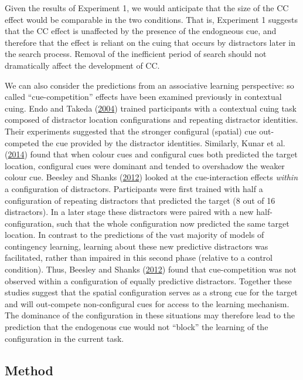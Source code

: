\documentclass[
  man,
  floatsintext,
  longtable,
  nolmodern,
  notxfonts,
  notimes,
  colorlinks=true,linkcolor=blue,citecolor=blue,urlcolor=blue]{apa7}
\begin{document}
Given the results of Experiment 1, we would anticipate that the size of
the CC effect would be comparable in the two conditions. That is,
Experiment 1 suggests that the CC effect is unaffected by the presence
of the endogneous cue, and therefore that the effect is reliant on the
cuing that occurs by distractors later in the search process. Removal of
the inefficient period of search should not dramatically affect the
development of CC.

We can also consider the predictions from an associative learning
perspective: so called ``cue-competition'' effects have been examined
previously in contextual cuing. Endo and Takeda
(\hyperref[ref-endo2004]{2004}) trained participants with a contextual
cuing task composed of distractor location configurations and repeating
distractor identities. Their experiments suggested that the stronger
configural (spatial) cue out-competed the cue provided by the distractor
identities. Similarly, Kunar et al. (\hyperref[ref-kunar2014]{2014})
found that when colour cues and configural cues both predicted the
target location, configural cues were dominant and tended to overshadow
the weaker colour cue. Beesley and Shanks
(\hyperref[ref-beesley2012]{2012}) looked at the cue-interaction effects
\emph{within} a configuration of distractors. Participants were first
trained with half a configuration of repeating distractors that
predicted the target (8 out of 16 distractors). In a later stage these
distractors were paired with a new half-configuration, such that the
whole configuration now predicted the same target location. In contrast
to the predictions of the vast majority of models of contingency
learning, learning about these new predictive distractors was
facilitated, rather than impaired in this second phase (relative to a
control condition). Thus, Beesley and Shanks
(\hyperref[ref-beesley2012]{2012}) found that cue-competition was not
observed within a configuration of equally predictive distractors.
Together these studies suggest that the spatial configuration serves as
a strong cue for the target and will out-compete non-configural cues for
access to the learning mechanism. The dominance of the configuration in
these situations may therefore lead to the prediction that the
endogenous cue would not ``block'' the learning of the configuration in
the current task.

\subsection{Method}\label{method-1}
\end{document}
